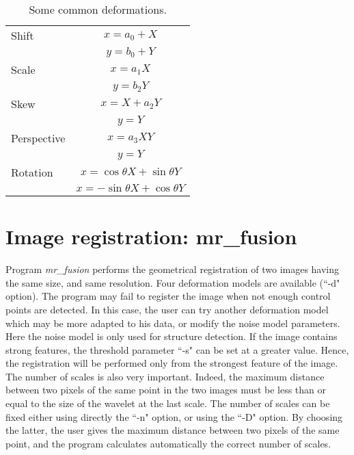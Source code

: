 \begin{table}[h]
\begin{center}
\begin{tabular}{l|c} \hline 
Shift       & $x  =  a_0 + X$                        \\ 
            & $y  =  b_0 + Y$                        \\ \hline
Scale       & $x  =  a_1 X$                          \\ 
            & $y  =  b_2 Y$                          \\ \hline
Skew        & $x  =  X + a_2 Y$                      \\
            & $y  =  Y$                              \\ \hline
Perspective & $x  =  a_3 X Y$                        \\
            & $y  =  Y$                              \\ \hline
Rotation    & $x  =   \cos \theta X + \sin \theta Y$ \\
     	    & $x  =  -\sin \theta X + \cos \theta Y$ \\ \hline 
\end{tabular}
\caption{Some common deformations.}
\end{center}
\label{table:deformations}
\end{table}


\section{Image registration: mr\_fusion}
Program {\em mr\_fusion} performs the geometrical registration 
of two images having the same size, and same resolution. Four deformation
models are available (``-d" option). The program may fail to register the image
when not enough control points are detected. In this case, the user can try
another deformation model which may be more adapted to his data, or modify
the noise model parameters. Here the noise model is only used for structure
detection. If the image contains strong features, the threshold parameter 
``-s"
can be set at a greater value. Hence, the registration will be performed only
from the strongest feature of the image. The number of scales is also very
important. Indeed, the maximum distance between two pixels of the same point
in the two images  must be less than or equal to the size of the wavelet at the
last scale. The number of scales can be fixed either using 
directly the ``-n" option,
or using the ``-D" option. 
By choosing the latter, the user gives the maximum distance
between two pixels of the same point, and the program calculates automatically
the correct number of scales. 

